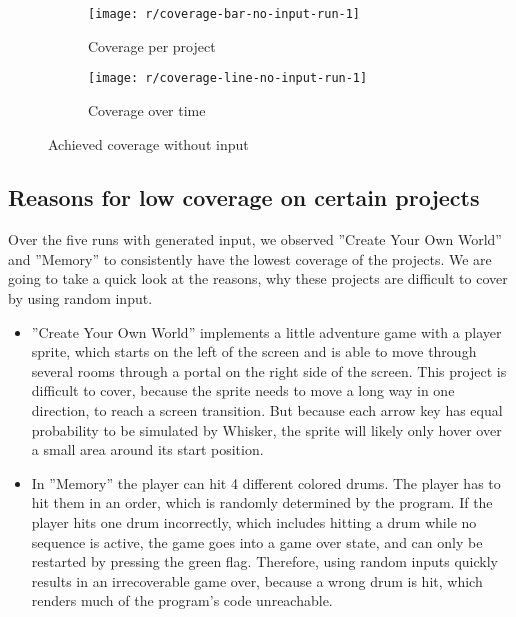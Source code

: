 \begin{figure}[htpb]
    \centering
    \begin{subfigure}{.8\textwidth}
        \texttt{[image: r/coverage-bar-no-input-run-1]}
        \caption{Coverage per project}
        \label{fig:coverage_no_input_bar}
    \end{subfigure}
    \begin{subfigure}{.8\textwidth}
        \texttt{[image: r/coverage-line-no-input-run-1]}
        \caption{Coverage over time}
        \label{fig:coverage_no_input_line}
    \end{subfigure}

    \caption{Achieved coverage without input}
    \label{fig:coverage_no_input}
\end{figure}

\subsection{Reasons for low coverage on certain projects}

Over the five runs with generated input, we observed ''Create Your Own World'' and ''Memory'' to consistently have the lowest coverage of the projects.
We are going to take a quick look at the reasons, why these projects are difficult to cover by using random input.

\begin{itemize}
    \item ''Create Your Own World'' implements a little adventure game with a player sprite, which starts on the left of the screen and is able to move through several rooms through a portal on the right side of the screen.
        This project is difficult to cover, because the sprite needs to move a long way in one direction, to reach a screen transition.
        But because each arrow key has equal probability to be simulated by Whisker, the sprite will likely only hover over a small area around its start position.
    \item In ''Memory'' the player can hit 4 different colored drums.
        The player has to hit them in an order, which is randomly determined by the program.
        If the player hits one drum incorrectly, which includes hitting a drum while no sequence is active, the game goes into a game over state,
        and can only be restarted by pressing the green flag.
        Therefore, using random inputs quickly results in an irrecoverable game over,
        because a wrong drum is hit, which renders much of the program's code unreachable.
\end{itemize}

